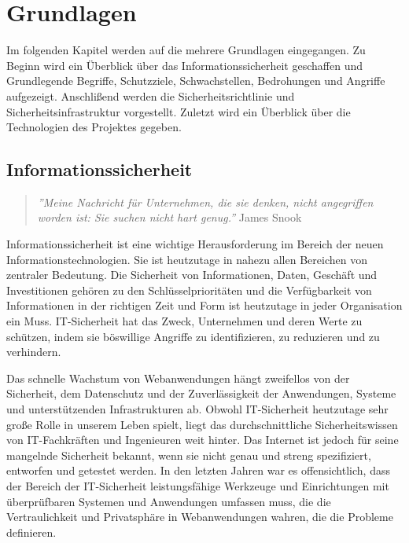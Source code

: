 \chapter{Grundlagen}
\label{chap:k2}

Im folgenden Kapitel werden auf die mehrere Grundlagen eingegangen. Zu Beginn wird ein Überblick über das Informationssicherheit geschaffen und Grundlegende Begriffe, Schutzziele, Schwachstellen, Bedrohungen und Angriffe aufgezeigt. Anschlißend werden die Sicherheitsrichtlinie und Sicherheitsinfrastruktur vorgestellt. Zuletzt wird ein Überblick über die Technologien des Projektes gegeben.

\section{Informationssicherheit}

\begin{quote}
	\emph{''Meine Nachricht für Unternehmen, die sie denken, nicht angegriffen worden ist: Sie suchen nicht hart genug.''}
	\hfill James Snook
\end{quote}

Informationssicherheit ist eine wichtige Herausforderung im Bereich der neuen Informationstechnologien. Sie ist heutzutage in nahezu allen Bereichen von zentraler Bedeutung.  Die Sicherheit von Informationen, Daten, Geschäft und Investitionen gehören zu den Schlüsselprioritäten und die Verfügbarkeit von Informationen in der richtigen Zeit und Form ist heutzutage in jeder Organisation ein Muss. IT-Sicherheit hat das Zweck, Unternehmen und deren Werte zu schützen, indem sie böswillige Angriffe zu identifizieren, zu reduzieren und zu verhindern.

Das schnelle Wachstum von Webanwendungen hängt zweifellos von der Sicherheit, dem Datenschutz und der Zuverlässigkeit der Anwendungen, Systeme und unterstützenden Infrastrukturen ab. Obwohl IT-Sicherheit heutzutage sehr große Rolle in unserem Leben spielt, liegt das durchschnittliche Sicherheitswissen von IT-Fachkräften und Ingenieuren weit hinter. Das Internet ist jedoch für seine mangelnde Sicherheit bekannt, wenn sie nicht genau und streng spezifiziert, entworfen und getestet werden. In den letzten Jahren war es offensichtlich, dass der Bereich der IT-Sicherheit leistungsfähige Werkzeuge und Einrichtungen mit überprüfbaren Systemen und Anwendungen umfassen muss, die die Vertraulichkeit und Privatsphäre in Webanwendungen wahren, die die Probleme definieren\cite[1]{furnell2008securing}.

